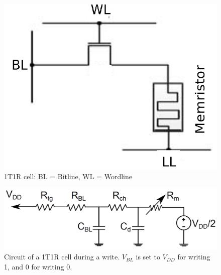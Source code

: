\documentclass{sig-alternate}
\begin{document}


\begin{figure}
  \includegraphics[scale=.29]{1t1real.png}
  \caption{1T1R cell: BL = Bitline, WL = Wordline}
  \label{fig:crossSwitch}
\end{figure}

\begin{figure}
  \includegraphics[scale=.2]{1t1rwrite.png}
  \caption{Circuit of a 1T1R cell during a write.  $V_{BL}$ is set to $V_{DD}$ for writing 1, and 0 for writing 0.}
  \label{fig:1t1rite}
\end{figure}
\end{document}
